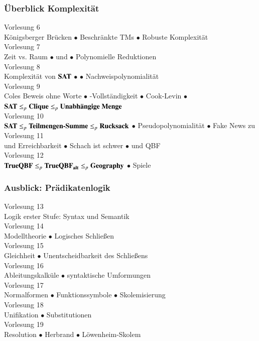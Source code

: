 \documentclass[aspectratio=1610,onlymath]{beamer}
\begin{document}
\begin{frame}\frametitle{Überblick Komplexität}

\begin{center}
\alert{Vorlesung 6}\\
Königsberger Brücken $\bullet$ Beschränkte TMs $\bullet$ Robuste Komplexität\\[0.8ex]
\alert{Vorlesung 7}\\
Zeit vs. Raum $\bullet$  und   $\bullet$ Polynomielle Reduktionen \\[0.8ex]
\alert{Vorlesung 8}\\
Komplexität von $\textbf{\textcolor{black}{SAT}}$ $\bullet$  $\bullet$ Nachweispolynomialität \\[0.8ex]
\alert{Vorlesung 9}\\
Coles Beweis ohne Worte $\bullet$ -Vollständigkeit $\bullet$ Cook-Levin $\bullet$ $\textbf{\textcolor{black}{SAT}}\leq_p \textbf{\textcolor{black}{Clique}}\leq_p \textbf{\textcolor{black}{Unabhängige Menge}}$ \\[0.8ex]
\alert{Vorlesung 10}\\
$\textbf{\textcolor{black}{SAT}}\leq_p \textbf{\textcolor{black}{Teilmengen-Summe}}\leq_p \textbf{\textcolor{black}{Rucksack}}$ $\bullet$ Pseudopolynomialität $\bullet$ Fake News zu  \\[0.8ex]
\alert{Vorlesung 11}\\
 und Erreichbarkeit $\bullet$ Schach ist schwer $\bullet$ \PSpace und QBF \\[0.8ex]
\alert{Vorlesung 12}\\
$\textbf{\textcolor{black}{TrueQBF}}\leq_p \textbf{\textcolor{black}{TrueQBF}}_{\textbf{\textcolor{black}{alt}}}\leq_p \textbf{\textcolor{black}{Geography}}$ $\bullet$ Spiele 
\end{center}

\end{frame}

\begin{frame}\frametitle{Ausblick: Prädikatenlogik}

\begin{center}
\alert{Vorlesung 13}\\
Logik erster Stufe: Syntax und Semantik\\[1ex]
\alert{Vorlesung 14}\\
Modelltheorie $\bullet$ Logisches Schließen\\[1ex]
\alert{Vorlesung 15}\\
Gleichheit $\bullet$ Unentscheidbarkeit des Schließens \\[1ex]
\alert{Vorlesung 16}\\
Ableitungskalküle $\bullet$ syntaktische Umformungen \\[1ex]
\alert{Vorlesung 17}\\
Normalformen $\bullet$ Funktionssymbole $\bullet$ Skolemisierung\\[1ex]
\alert{Vorlesung 18}\\
Unifikation $\bullet$ Substitutionen \\[1ex]
\alert{Vorlesung 19}\\
Resolution $\bullet$ Herbrand $\bullet$ Löwenheim-Skolem
\end{center}

\end{frame}
\end{document}
